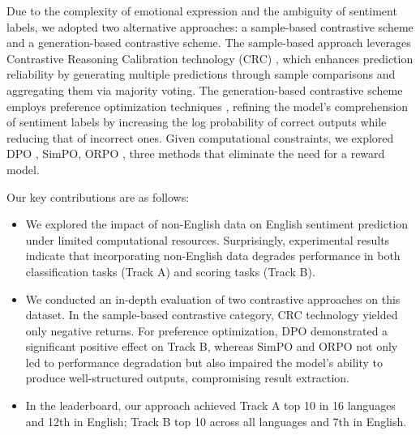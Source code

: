 \documentclass[11pt]{article}
\begin{document}

Due to the complexity of emotional expression and the ambiguity of sentiment labels, we adopted two alternative approaches: a sample-based contrastive scheme and a generation-based contrastive scheme. The sample-based approach leverages Contrastive Reasoning Calibration technology (CRC) \cite{li2024chinchunmei}, which enhances prediction reliability by generating multiple predictions through sample comparisons and aggregating them via majority voting. The generation-based contrastive scheme employs preference optimization techniques \cite{rafailov2023direct, hong2024orpo, meng2025simpo}, refining the model’s comprehension of sentiment labels by increasing the log probability of correct outputs while reducing that of incorrect ones. Given computational constraints, we explored DPO \cite{rafailov2023direct}, SimPO\cite{meng2025simpo},  ORPO \cite{rafailov2023direct}, three methods that eliminate the need for a reward model.



Our key contributions are as follows:

\begin{itemize}
	\item We explored the impact of non-English data on English sentiment prediction under limited computational resources. Surprisingly, experimental results indicate that incorporating non-English data degrades performance in both classification tasks (Track A) and scoring tasks (Track B).
	\item We conducted an in-depth evaluation of two contrastive approaches on this dataset. In the sample-based contrastive category, CRC technology yielded only negative returns. For preference optimization, DPO demonstrated a significant positive effect on Track B, whereas SimPO and ORPO not only led to performance degradation but also impaired the model's ability to produce well-structured outputs, compromising result extraction.
	\item In the leaderboard, our approach achieved Track A top 10 in 16 languages and 12th in English; Track B top 10 across all languages and 7th in English.
\end{itemize}
\end{document}
